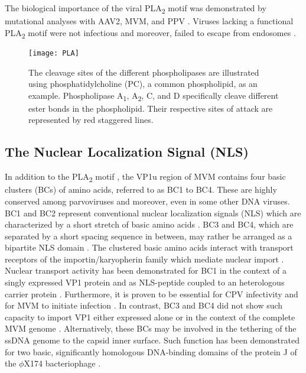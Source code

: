 The biological importance of the viral PLA\textsubscript{2} motif was demonstrated by mutational analyses with AAV2, MVM, and PPV \cite{pmid16284249, pmid11702787, pmid20974479}. Viruses lacking a functional PLA\textsubscript{2} motif were not infectious and moreover, failed to escape from endosomes \cite{pmid16284249, pmid14644609,  pmid11799199, pmid11961250}.               

\begin{figure}
\centering
  \texttt{[image: PLA]}
  \caption[The cleavage sites of different types of phospholipases]
   {The cleavage sites of the different phospholipases are illustrated using phosphatidylcholine (PC), a common phospholipid, as an example. Phospholipase A\textsubscript{1}, A\textsubscript{2}, C, and D specifically cleave different ester bonds in the phospholipid. Their respective sites of attack are represented by red staggered lines.} 
\label{PLA}
\end{figure}

\subsection{The Nuclear Localization Signal (NLS)}
\label{NLS1}
In addition to the PLA\textsubscript{2} motif \cite{pmid11702787}, the VP1u region of MVM contains four basic clusters (BCs) of amino acids, referred to as BC1 to BC4. These are highly conserved among parvoviruses and moreover, even in some other DNA viruses. BC1 and BC2 represent conventional nuclear localization signals (NLS) which are characterized by a short stretch of basic amino acids \cite{pmid6096007, pmid6088992}. BC3 and BC4, which are separated by a short spacing sequence in between, may rather be arranged as a bipartite NLS domain \cite{pmid1991323}. The clustered basic amino acids interact with transport receptors of the importin/karyopherin family which mediate nuclear import \cite{pmid9126736, pmid9759490, pmid12067655}. Nuclear transport activity has been demonstrated for BC1 in the context of a singly expressed VP1 protein \cite{pmid12072505} and as NLS-peptide coupled to an heterologous carrier protein \cite{pmid9428689}. Furthermore, it is proven to be essential for CPV infectivity \cite{pmid11799183} and for MVM to initiate infection \cite{pmid12072505}. In contrast, BC3 and BC4 did not show such capacity to import VP1 either expressed alone \cite{pmid9428689} or in the context of the complete MVM genome \cite{pmid12072505}. Alternatively, these BCs may be involved in the tethering of the ssDNA genome to the capsid inner surface. Such function has been demonstrated for two basic, significantly homologous DNA-binding domains of the protein J of the $\phi$X174 bacteriophage \cite{pmid11991963}.

